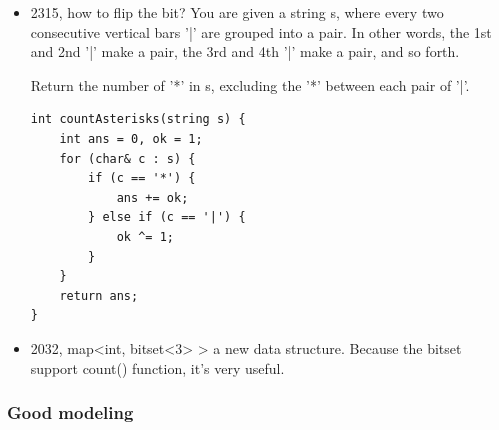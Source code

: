 \documentclass[a4paper,11pt,twoside]{book}
\begin{document}
\begin{itemize}
	\item 2315, how to flip the bit? You are given a string s, where every two consecutive vertical bars '|' are grouped into a pair. In other words, the 1st and 2nd '|' make a pair, the 3rd and 4th '|' make a pair, and so forth.
	
	Return the number of '*' in s, excluding the '*' between each pair of '|'.
\begin{lstlisting}
int countAsterisks(string s) {
	int ans = 0, ok = 1;
	for (char& c : s) {
		if (c == '*') {
			ans += ok;
		} else if (c == '|') {
			ok ^= 1;
		}
	}
	return ans;
}
\end{lstlisting}

	\item 2032, map<int, bitset<3> > a new data structure. Because the bitset support count() function, it's very useful. 
	
	
\end{itemize}

\subsubsection{Good modeling}
\end{document}
